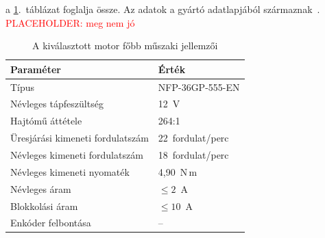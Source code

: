 a \ref{tab:motor-parameterek}.~táblázat foglalja össze.
Az adatok a gyártó adatlapjából származnak~\cite{nfp36gp555}.
\textcolor{red}{PLACEHOLDER: meg nem jó}
\begin{table}[H]
    \centering
    \caption{A kiválasztott motor főbb műszaki jellemzői}
    \label{tab:motor-parameterek}
    \renewcommand{\arraystretch}{1.2}
    \begin{tabular}{|l|l|}
        \hline
        \rowcolor{blue!15}
        \textbf{Paraméter} & \textbf{Érték} \\
        \hline
        Típus & NFP-36GP-555-EN \\
        \hline
        Névleges tápfeszültség & 12~V \\
        \hline
        Hajtómű áttétele & 264:1 \\
        \hline
        Üresjárási kimeneti fordulatszám & 22~fordulat/perc \\
        \hline
        Névleges kimeneti fordulatszám & 18~fordulat/perc \\
        \hline
        Névleges kimeneti nyomaték & 4,90~N\,m \\
        \hline
        Névleges áram & $\leq 2$~A \\
        \hline
        Blokkolási áram & $\leq 10$~A \\
        \hline
        Enkóder felbontása & -- \\
        \hline
    \end{tabular}
\end{table}

